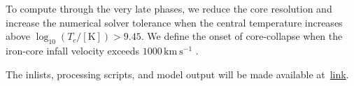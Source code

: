 \documentclass[twocolumn,twocolappendix,trackchanges]{aastex63}
\begin{document}
To compute through the very late phases, we reduce the core resolution
and increase the numerical solver tolerance when the central
temperature increases above $\log_{10}(T_c/\mathrm{[K]})>9.45$. We
define the onset of core-collapse when the iron-core infall velocity
exceeds $1000\,\mathrm{km\ s^{-1}}$ \citep[e.g.,][]{woosley:02}.

The inlists, processing scripts, and model output will be made available at~\href{link}{link}.



\end{document}
